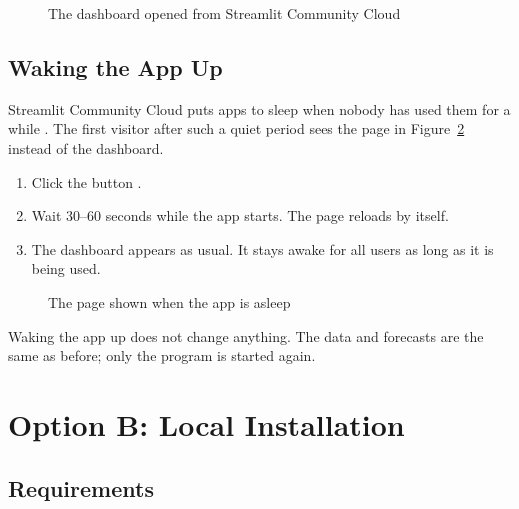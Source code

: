 \begin{figure}[H]
  \centering
  \caption{The dashboard opened from Streamlit Community Cloud}
  \label{fig:cloudLanding}
\end{figure}

\subsection{Waking the App Up}
\label{sec:instWake}

Streamlit Community Cloud puts apps to sleep when nobody has used them for a while \cite{StreamlitCloud:2026}. The first visitor after such a quiet period sees the page in Figure~\ref{fig:cloudSleeping} instead of the dashboard.

\begin{enumerate}
  \item Click the button .
  \item Wait 30--60 seconds while the app starts. The page reloads by itself.
  \item The dashboard appears as usual. It stays awake for all users as long as it is being used.
\end{enumerate}

\begin{figure}[H]
  \centering
  \caption{The page shown when the app is asleep}
  \label{fig:cloudSleeping}
\end{figure}

\begin{NoteBox}
Waking the app up does not change anything. The data and forecasts are the same as before; only the program is started again.
\end{NoteBox}

\section{Option B: Local Installation}
\label{sec:instLocal}

\subsection{Requirements}
\label{sec:instLocalReq}

